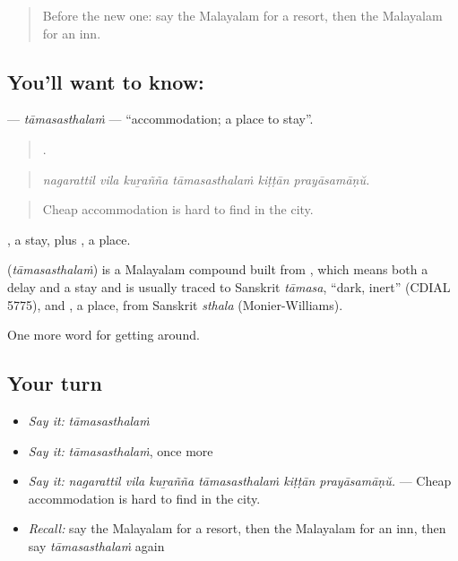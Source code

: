 \label{lesson:ML-C481-tamasasthalam}



\begin{quote}
Before the new one: say the Malayalam for a resort, then the Malayalam for an inn.
\end{quote}

\subsection*{You'll want to know: }
\textbf{} — \emph{tāmasasthalaṁ} — \textquotedblleft{}accommodation; a place to stay\textquotedblright{}.

\begin{quote}
     .
\end{quote}

\begin{quote}
\emph{nagarattil vila kuṟañña tāmasasthalaṁ kiṭṭān prayāsamāṇŭ.}
\end{quote}

\begin{quote}
Cheap accommodation is hard to find in the city.
\end{quote}

, a stay, plus , a place.

\begin{cousinweb}
\textbf{} (\emph{tāmasasthalaṁ}) is a Malayalam compound built from , which means both a delay and a stay and is usually traced to Sanskrit \emph{tāmasa}, \textquotedblleft{}dark, inert\textquotedblright{} (CDIAL 5775), and , a place, from Sanskrit \emph{sthala} (Monier-Williams).
\end{cousinweb}

\begin{grammarlens}[title={What you've built}]
One more word for getting around.
\end{grammarlens}

\subsection*{Your turn}
\begin{itemize}
\raggedright
  \item \emph{Say it:} \emph{tāmasasthalaṁ}
  \item \emph{Say it:} \emph{tāmasasthalaṁ}, once more
  \item \emph{Say it:} \emph{nagarattil vila kuṟañña tāmasasthalaṁ kiṭṭān prayāsamāṇŭ.} — Cheap accommodation is hard to find in the city.
  \item \emph{Recall:} say the Malayalam for a resort, then the Malayalam for an inn, then say \emph{tāmasasthalaṁ} again
\end{itemize}

